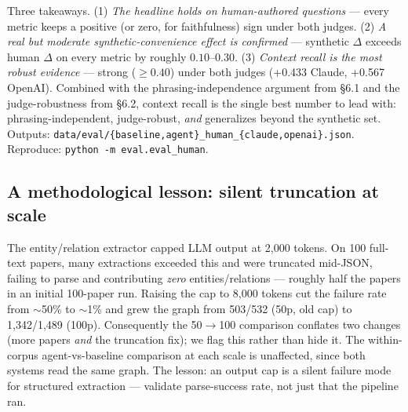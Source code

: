 \documentclass[11pt]{article}
\begin{document}
Three takeaways. (1) \emph{The headline holds on human-authored questions} --- every metric keeps a positive (or zero, for faithfulness) sign under both judges. (2) \emph{A real but moderate synthetic-convenience effect is confirmed} --- synthetic $\Delta$ exceeds human $\Delta$ on every metric by roughly $0.10$--$0.30$. (3) \emph{Context recall is the most robust evidence} --- strong ($\geq 0.40$) under both judges (+0.433 Claude, +0.567 OpenAI). Combined with the phrasing-independence argument from \S6.1 and the judge-robustness from \S6.2, context recall is the single best number to lead with: phrasing-independent, judge-robust, \emph{and} generalizes beyond the synthetic set. Outputs: \texttt{data/eval/\{baseline,agent\}\_human\_\{claude,openai\}.json}. Reproduce: \texttt{python -m eval.eval\_human}.

\subsection{A methodological lesson: silent truncation at scale}
\label{sec:truncation}
The entity/relation extractor capped LLM output at 2{,}000 tokens. On 100 full-text papers, many extractions exceeded this and were truncated mid-JSON, failing to parse and contributing \emph{zero} entities/relations --- roughly half the papers in an initial 100-paper run. Raising the cap to 8{,}000 tokens cut the failure rate from $\sim$50\% to $\sim$1\% and grew the graph from 503/532 (50p, old cap) to 1{,}342/1{,}489 (100p). Consequently the 50$\to$100 comparison conflates two changes (more papers \emph{and} the truncation fix); we flag this rather than hide it. The within-corpus agent-vs-baseline comparison at each scale is unaffected, since both systems read the same graph. The lesson: an output cap is a silent failure mode for structured extraction --- validate parse-success rate, not just that the pipeline ran.
\end{document}

